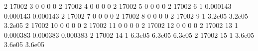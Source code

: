 \documentclass[letterpaper,10pt,english,openany,oneside]{sphinxmanual}
\begin{document}
\begin{sphinxVerbatim}[commandchars=\\\{\}]
     2 \textbar{}       17002 \textbar{}     3 \textbar{}           0 \textbar{}          0 \textbar{}        0 \textbar{}        0 \textbar{}        \textbar{}        \textbar{}        \textbar{}
     2 \textbar{}       17002 \textbar{}     4 \textbar{}           0 \textbar{}          0 \textbar{}        0 \textbar{}        0 \textbar{}        \textbar{}        \textbar{}        \textbar{}
     2 \textbar{}       17002 \textbar{}     5 \textbar{}           0 \textbar{}          0 \textbar{}        0 \textbar{}        0 \textbar{}        \textbar{}        \textbar{}        \textbar{}
     2 \textbar{}       17002 \textbar{}     6 \textbar{}           1 \textbar{}   0.000143 \textbar{} 0.000143 \textbar{} 0.000143 \textbar{}        \textbar{}        \textbar{}        \textbar{}
     2 \textbar{}       17002 \textbar{}     7 \textbar{}           0 \textbar{}          0 \textbar{}        0 \textbar{}        0 \textbar{}        \textbar{}        \textbar{}        \textbar{}
     2 \textbar{}       17002 \textbar{}     8 \textbar{}           0 \textbar{}          0 \textbar{}        0 \textbar{}        0 \textbar{}        \textbar{}        \textbar{}        \textbar{}
     2 \textbar{}       17002 \textbar{}     9 \textbar{}           1 \textbar{}    3.2e\PYGZhy{}05 \textbar{}  3.2e\PYGZhy{}05 \textbar{}  3.2e\PYGZhy{}05 \textbar{}        \textbar{}        \textbar{}        \textbar{}
     2 \textbar{}       17002 \textbar{}    10 \textbar{}           0 \textbar{}          0 \textbar{}        0 \textbar{}        0 \textbar{}        \textbar{}        \textbar{}        \textbar{}
     2 \textbar{}       17002 \textbar{}    11 \textbar{}           0 \textbar{}          0 \textbar{}        0 \textbar{}        0 \textbar{}        \textbar{}        \textbar{}        \textbar{}
     2 \textbar{}       17002 \textbar{}    12 \textbar{}           0 \textbar{}          0 \textbar{}        0 \textbar{}        0 \textbar{}        \textbar{}        \textbar{}        \textbar{}
     2 \textbar{}       17002 \textbar{}    13 \textbar{}           1 \textbar{}   0.000383 \textbar{} 0.000383 \textbar{} 0.000383 \textbar{}        \textbar{}        \textbar{}        \textbar{}
     2 \textbar{}       17002 \textbar{}    14 \textbar{}           1 \textbar{}    6.3e\PYGZhy{}05 \textbar{}  6.3e\PYGZhy{}05 \textbar{}  6.3e\PYGZhy{}05 \textbar{}        \textbar{}        \textbar{}        \textbar{}
     2 \textbar{}       17002 \textbar{}    15 \textbar{}           1 \textbar{}    3.6e\PYGZhy{}05 \textbar{}  3.6e\PYGZhy{}05 \textbar{}  3.6e\PYGZhy{}05 \textbar{}        \textbar{}        \textbar{}        \textbar{}

\end{sphinxVerbatim}
\end{document}
